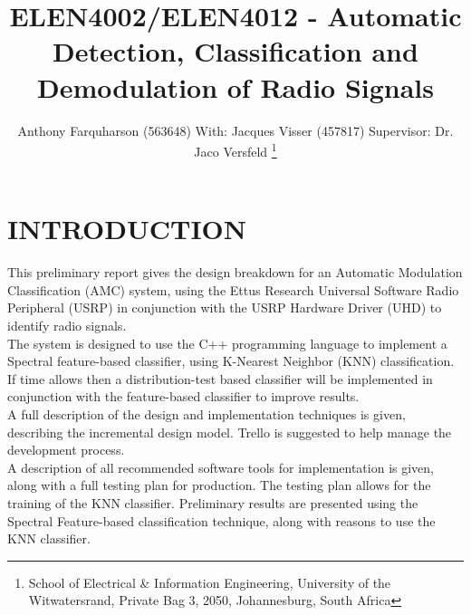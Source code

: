 \documentclass[10pt,twocolumn]{witseiepaper}
\begin{document}
\title{ELEN4002/ELEN4012 - Automatic Detection, Classification and Demodulation of Radio Signals}

\author{Anthony Farquharson (563648) \textnormal{\newline With: Jacques Visser (457817)
\newline Supervisor: Dr. Jaco Versfeld}
\thanks{School of Electrical \& Information Engineering, University of the
Witwatersrand, Private Bag 3, 2050, Johannesburg, South Africa}
}



\maketitle
\thispagestyle{empty}\pagestyle{empty}

\section{INTRODUCTION}
This preliminary report gives the design breakdown for an Automatic Modulation Classification (AMC) system, using the Ettus Research Universal Software Radio Peripheral (USRP) in conjunction with the USRP Hardware Driver (UHD) to identify radio signals.\\[10pt]
The system is designed to use the C++ programming language to implement a Spectral feature-based classifier, using K-Nearest Neighbor (KNN) classification. If time allows then a distribution-test based classifier will be implemented in conjunction with the feature-based classifier to improve results.\\[10pt]
A full description of the design and implementation techniques is given, describing the incremental design model. Trello is suggested to help manage the development process.\\[10pt]
A description of all recommended software tools for implementation is given, along with a full testing plan for production. The testing plan allows for the training of the KNN classifier. Preliminary results are presented using the Spectral Feature-based classification technique, along with reasons to use the KNN classifier.
\end{document}
